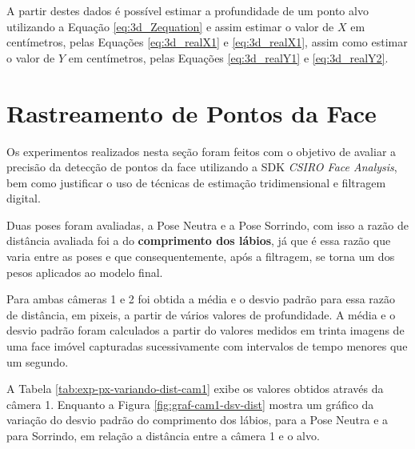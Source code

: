 A partir destes dados é possível estimar a profundidade de um ponto alvo utilizando a Equação \ref{eq:3d_Zequation} e assim estimar o valor de $X$ em centímetros, pelas Equações \ref{eq:3d_realX1} e \ref{eq:3d_realX1}, assim como estimar o valor de $Y$ em centímetros, pelas Equações \ref{eq:3d_realY1} e \ref{eq:3d_realY2}.

\section{Rastreamento de Pontos da Face}

Os experimentos realizados nesta seção foram feitos com o objetivo de avaliar a precisão da detecção de pontos da face utilizando a SDK \textit{CSIRO Face Analysis}, bem como justificar o uso de técnicas de estimação tridimensional e filtragem digital.

Duas poses foram avaliadas, a Pose Neutra e a Pose Sorrindo, com isso a razão de distância avaliada foi a do \textbf{comprimento dos lábios}, já que é essa razão que varia entre as poses e que consequentemente, após a filtragem, se torna um dos pesos aplicados ao modelo final.

Para ambas câmeras 1 e 2 foi obtida a média e o desvio padrão para essa razão de distância, em pixeis, a partir de vários valores de profundidade. A média e o desvio padrão foram calculados a partir do valores medidos em trinta imagens de uma face imóvel capturadas sucessivamente com intervalos de tempo menores que um segundo.

A Tabela \ref{tab:exp-px-variando-dist-cam1} exibe os valores obtidos através da câmera 1. Enquanto a Figura \ref{fig:graf-cam1-dsv-dist} mostra um gráfico da variação do desvio padrão do comprimento dos lábios, para a Pose Neutra e a para Sorrindo, em relação a distância entre a câmera 1 e o alvo.


